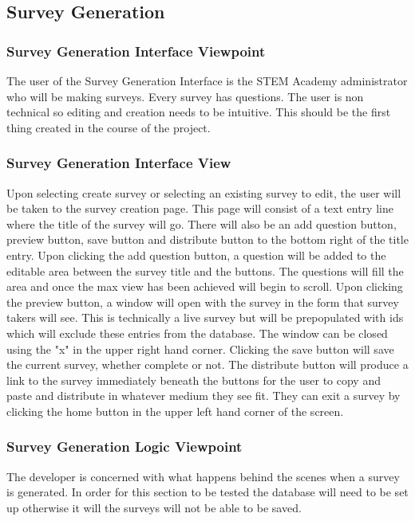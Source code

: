 \subsection{Survey Generation}
\subsubsection{Survey Generation Interface Viewpoint}
The user of the Survey Generation Interface is the STEM Academy administrator who will be making surveys. Every survey has
questions. The user is non technical so editing and creation needs to be intuitive. This should be the first thing created in the course
of the project.  
\subsubsection{Survey Generation Interface View}
Upon selecting create survey or selecting an existing survey to edit, the user will be taken to the survey creation page. 
This page will consist of a text entry line where the title of the survey will go. There will also be an add question button, preview button, save button and distribute button to the bottom right of the title entry. Upon clicking the add question button, a question will be added to the 
editable area between the survey title and the buttons. The questions will fill the area and once the max view has been achieved will begin to scroll. Upon clicking the preview button, a window will open with the survey in the form that survey takers will see. This is 
technically a live survey but will be prepopulated with ids which will exclude these entries from the database. The window can be closed using the "x" in the upper right hand corner. Clicking the save button will save the current survey, whether complete or not.
 The distribute button will produce a link to the survey immediately beneath the buttons for the user to copy and paste and distribute 
in whatever medium they see fit. They can exit a survey by clicking the home button in the upper left hand corner of the screen.  

\subsubsection{Survey Generation Logic Viewpoint}
The developer is concerned with what happens behind the scenes when a survey is generated. In order for this section to be tested
 the database will need to be set up otherwise it will the surveys will not be able to be saved. 
